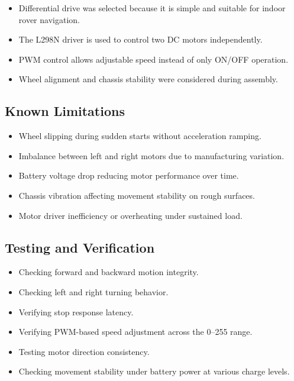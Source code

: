 \documentclass[12pt,a4paper]{article}
\begin{document}
\begin{itemize}[leftmargin=1.5em]
  \item Differential drive was selected because it is simple and suitable for indoor rover navigation.
  \item The L298N driver is used to control two DC motors independently.
  \item PWM control allows adjustable speed instead of only ON/OFF operation.
  \item Wheel alignment and chassis stability were considered during assembly.
\end{itemize}

\subsection{Known Limitations}

\begin{itemize}[leftmargin=1.5em]
  \item Wheel slipping during sudden starts without acceleration ramping.
  \item Imbalance between left and right motors due to manufacturing variation.
  \item Battery voltage drop reducing motor performance over time.
  \item Chassis vibration affecting movement stability on rough surfaces.
  \item Motor driver inefficiency or overheating under sustained load.
\end{itemize}

\subsection{Testing and Verification}

\begin{itemize}[leftmargin=1.5em]
  \item Checking forward and backward motion integrity.
  \item Checking left and right turning behavior.
  \item Verifying stop response latency.
  \item Verifying PWM-based speed adjustment across the 0--255 range.
  \item Testing motor direction consistency.
  \item Checking movement stability under battery power at various charge levels.
\end{itemize}
\end{document}
